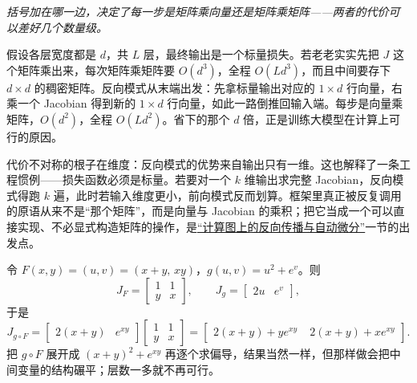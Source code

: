 \begin{center}

\emph{括号加在哪一边，决定了每一步是矩阵乘向量还是矩阵乘矩阵——两者的代价可以差好几个数量级。}
\end{center}

假设各层宽度都是 \(d\)，共 \(L\) 层，最终输出是一个标量损失。若老老实实先把 \(J\) 这个矩阵乘出来，每次矩阵乘矩阵要 \(O(d^3)\)，全程 \(O(Ld^3)\)，而且中间要存下 \(d\times d\) 的稠密矩阵。反向模式从末端出发：先拿标量输出对应的 \(1\times d\) 行向量，右乘一个 Jacobian 得到新的 \(1\times d\) 行向量，如此一路倒推回输入端。每步是向量乘矩阵，\(O(d^2)\)，全程 \(O(Ld^2)\)。省下的那个 \(d\) 倍，正是训练大模型在计算上可行的原因。

代价不对称的根子在维度：反向模式的优势来自输出只有一维。这也解释了一条工程惯例——损失函数必须是标量。若要对一个 \(k\) 维输出求完整 Jacobian，反向模式得跑 \(k\) 遍，此时若输入维度更小，前向模式反而划算。框架里真正被反复调用的原语从来不是``那个矩阵''，而是向量与 Jacobian 的乘积；把它当成一个可以直接实现、不必显式构造矩阵的操作，是\hyperref[sec:10-Matrix-Calculus/04-Applications/03]{``计算图上的反向传播与自动微分''}一节的出发点。

\begin{example}
令 \(F(x,y)=(u,v)=(x+y,\,xy)\)，\(g(u,v)=u^2+e^{v}\)。则
\[
J_F=\begin{bmatrix}1&1\\ y&x\end{bmatrix},
\qquad
J_g=\begin{bmatrix}2u&e^{v}\end{bmatrix},
\]
于是
\[
J_{g\circ F}
=\begin{bmatrix}2(x+y)&e^{xy}\end{bmatrix}
\begin{bmatrix}1&1\\ y&x\end{bmatrix}
=\begin{bmatrix}2(x+y)+ye^{xy}&\;2(x+y)+xe^{xy}\end{bmatrix}.
\]
把 \(g\circ F\) 展开成 \((x+y)^2+e^{xy}\) 再逐个求偏导，结果当然一样，但那样做会把中间变量的结构碾平；层数一多就不再可行。
\end{example}

